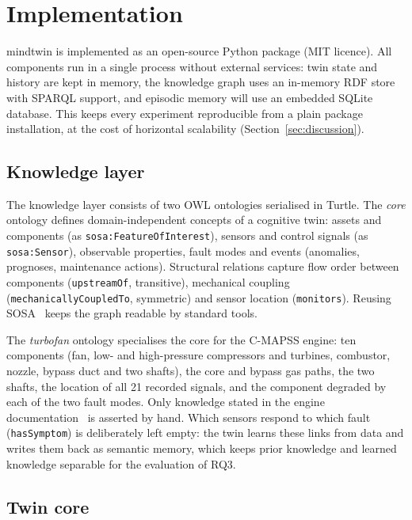 \section{Implementation}
\label{sec:implementation}

mindtwin is implemented as an open-source Python package (MIT licence). All components run in a
single process without external services: twin state and history are kept in memory, the
knowledge graph uses an in-memory RDF store with SPARQL support, and episodic memory will use an
embedded SQLite database. This keeps every experiment reproducible from a plain package
installation, at the cost of horizontal scalability (Section~\ref{sec:discussion}).

\subsection{Knowledge layer}
\label{sec:impl-knowledge}

The knowledge layer consists of two OWL ontologies serialised in Turtle. The \emph{core} ontology
defines domain-independent concepts of a cognitive twin: assets and components (as
\texttt{sosa:FeatureOfInterest}), sensors and control signals (as \texttt{sosa:Sensor}), observable
properties, fault modes and events (anomalies, prognoses, maintenance actions). Structural
relations capture flow order between components (\texttt{upstreamOf}, transitive), mechanical
coupling (\texttt{mechanicallyCoupledTo}, symmetric) and sensor location (\texttt{monitors}).
Reusing SOSA~\citep{w3c2017sosa} keeps the graph readable by standard tools.

The \emph{turbofan} ontology specialises the core for the C-MAPSS engine: ten components (fan,
low- and high-pressure compressors and turbines, combustor, nozzle, bypass duct and two shafts),
the core and bypass gas paths, the two shafts, the location of all 21 recorded signals, and the
component degraded by each of the two fault modes. Only knowledge stated in the engine
documentation~\citep{saxena2008damage} is asserted by hand. Which sensors respond to which fault
(\texttt{hasSymptom}) is deliberately left empty: the twin learns these links from data and writes
them back as semantic memory, which keeps prior knowledge and learned knowledge separable for the
evaluation of RQ3.

\subsection{Twin core}
\label{sec:impl-core}

